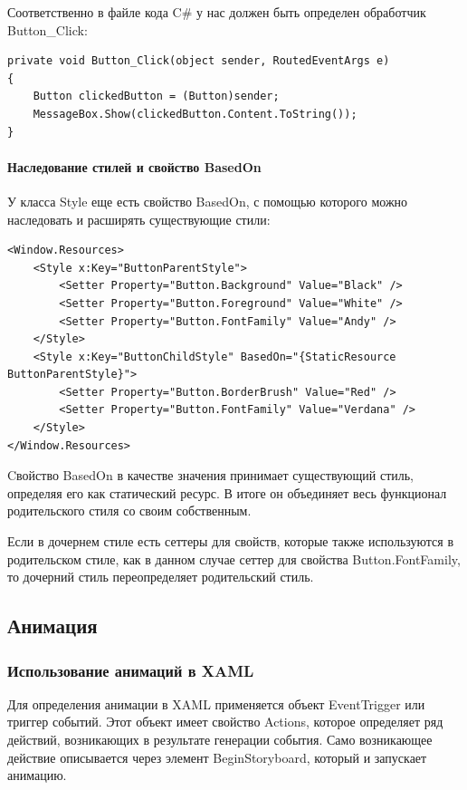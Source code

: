 Соответственно в файле кода C\# у нас должен быть определен обработчик Button\_Click:

\begin{verbatim}
private void Button_Click(object sender, RoutedEventArgs e)
{
    Button clickedButton = (Button)sender;
    MessageBox.Show(clickedButton.Content.ToString());
}
\end{verbatim}


\paragraph{Наследование стилей и свойство BasedOn}

У класса Style еще есть свойство BasedOn, с помощью которого можно наследовать и расширять существующие стили:

\begin{verbatim}
<Window.Resources>
    <Style x:Key="ButtonParentStyle">
        <Setter Property="Button.Background" Value="Black" />
        <Setter Property="Button.Foreground" Value="White" />
        <Setter Property="Button.FontFamily" Value="Andy" />
    </Style>
    <Style x:Key="ButtonChildStyle" BasedOn="{StaticResource ButtonParentStyle}">
        <Setter Property="Button.BorderBrush" Value="Red" />
        <Setter Property="Button.FontFamily" Value="Verdana" />
    </Style>
</Window.Resources>
\end{verbatim}


Cвойство BasedOn в качестве значения принимает существующий стиль, определяя его как статический ресурс. В итоге он объединяет весь функционал родительского стиля со своим собственным.

Если в дочернем стиле есть сеттеры для свойств, которые также используются в родительском стиле, как в данном случае сеттер для свойства Button.FontFamily, то дочерний стиль переопределяет родительский стиль.

\subsection{Анимация}

\subsubsection{Использование анимаций в XAML}

Для определения анимации в XAML применяется объект EventTrigger или триггер событий. Этот объект имеет свойство Actions, которое определяет ряд действий, возникающих в результате генерации события. Само возникающее действие описывается через элемент BeginStoryboard, который и запускает анимацию.

